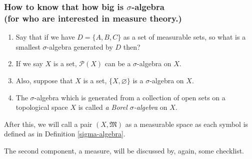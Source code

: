 \documentclass[12pt, a4paper]{report}
\begin{document}
    \subsubsection{How to know that how big is $\sigma$-algebra\\ (for who are interested in measure theory.)}
    
    \begin{enumerate}
    \item Say that if we have $D = \{A,B,C\}$ as a set of measurable sets, so what is a smallest $\sigma$-algebra generated by $D$ then?
    \item If we say $X$ is a set, $\mathcal{P}(X)$ can be a $\sigma$-algebra on $X$.
    \item Also, suppose that $X$ is a set, $\{X, \varnothing\}$ is a $\sigma$-algebra on $X$.
    \item The $\sigma$-algebra which is generated from a collection of open sets on a topological space $X$ is called \emph{a Borel $\sigma$-algebra} on $X$.
    \end{enumerate}

    After this, we will call a pair $(X, \mathfrak{M})$ as a measurable space as each symbol is defined as in Definition \ref{sigma-algebra}.

    The second component, a measure, will be discussed by, again, some checklist.
\end{document}
